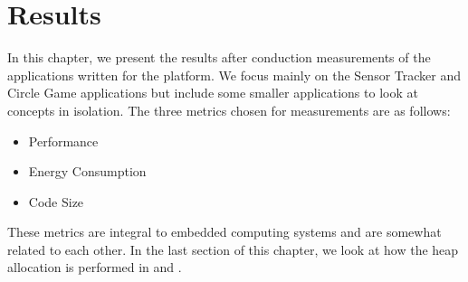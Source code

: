 
\chapter{Results}
\label{chap:results}

In this chapter, we present the results after conduction measurements of the applications written for the {\rg} platform.
We focus mainly on the Sensor Tracker and Circle Game applications but include some smaller applications to look at concepts in isolation.
The three metrics chosen for measurements are as follows:
\begin{itemize}
  \item Performance
  \item Energy Consumption
  \item Code Size
\end{itemize}
These metrics are integral to embedded computing systems and are somewhat related to each other.
In the last section of this chapter, we look at how the heap allocation is performed in {\rust} and {\C}.





